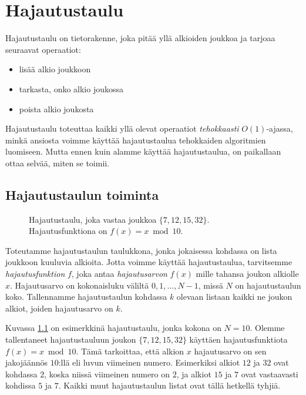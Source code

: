 \chapter{Hajautustaulu}

Hajautustaulu on tietorakenne,
joka pitää yllä alkioiden joukkoa ja tarjoaa
seuraavat operaatiot:

\begin{itemize}
\item lisää alkio joukkoon
\item tarkasta, onko alkio joukossa
\item poista alkio joukosta
\end{itemize}

Hajautustaulu toteuttaa kaikki yllä olevat
operaatiot \emph{tehokkaasti} $O(1)$-ajassa,
minkä ansiosta voimme käyttää hajautustaulua
tehokkaiden algoritmien luomiseen.
Mutta ennen kuin alamme käyttää hajautustaulua,
on paikallaan ottaa selvää, miten se toimii.

\section{Hajautustaulun toiminta}

\begin{figure}
\center
{}
\caption{Hajautustaulu, joka vastaa joukkoa $\{7,12,15,32\}$.
Hajautusfunktiona on $f(x)=x \bmod 10$.}
\label{fig:hajtau}
\end{figure}

Toteutamme hajautustaulun taulukkona,
jonka jokaisessa kohdassa on lista joukkoon kuuluvia alkioita.
Jotta voimme käyttää hajautustaulua,
tarvitsemme \emph{hajautusfunktion} $f$,
joka antaa \emph{hajautusarvon}
$f(x)$ mille tahansa joukon alkiolle $x$.
Hajautusarvo on kokonaisluku väliltä
$0,1,\dots,N-1$, missä $N$ on hajautustaulun koko.
Tallennamme hajautustaulun kohdassa $k$ olevaan listaan
kaikki ne joukon alkiot, joiden hajautusarvo on $k$.

Kuvassa \ref{fig:hajtau} on esimerkkinä hajautustaulu,
jonka kokona on $N=10$.
Olemme tallentaneet hajautustauluun joukon $\{7,12,15,32\}$
käyttäen hajautusfunktiota $f(x)=x \bmod 10$.
Tämä tarkoittaa, että alkion $x$ hajautusarvo on sen jakojäännös $10$:llä
eli luvun viimeinen numero.
Esimerkiksi alkiot $12$ ja $32$ ovat kohdassa $2$,
koska niissä viimeinen numero on $2$,
ja alkiot $15$ ja $7$ ovat vastaavasti kohdissa $5$ ja $7$.
Kaikki muut hajautustaulun listat ovat tällä hetkellä tyhjiä.

